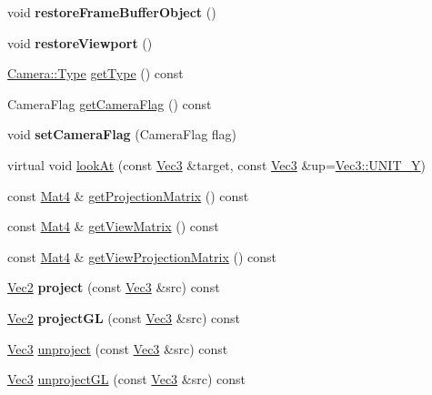 \begin{DoxyCompactItemize}
void {\bfseries restore\+Frame\+Buffer\+Object} ()
\item 
\mbox{\label{classCamera_abe884ec7b69ff038dfae1ec47e6cd6d8}} 
void {\bfseries restore\+Viewport} ()
\item 
\hyperlink{classCamera_a3b0a1f58deca679ac665f61c480d1dcb}{Camera\+::\+Type} \hyperlink{classCamera_ae8f514578aa54023476ad541b167a1e0}{get\+Type} () const
\item 
Camera\+Flag \hyperlink{classCamera_ae7a648c0780484ba413a6197a489f208}{get\+Camera\+Flag} () const
\item 
\mbox{\label{classCamera_a8e214f667fd598da856d0e29eb101c7b}} 
void {\bfseries set\+Camera\+Flag} (Camera\+Flag flag)
\item 
virtual void \hyperlink{classCamera_a0eca5fae6b9b7a1ad949d9647e48ca52}{look\+At} (const \hyperlink{classVec3}{Vec3} \&target, const \hyperlink{classVec3}{Vec3} \&up=\hyperlink{classVec3_a0d569defe7293f1cb108f643230facf5}{Vec3\+::\+U\+N\+I\+T\+\_\+Y})
\item 
const \hyperlink{classMat4}{Mat4} \& \hyperlink{classCamera_a5fd60cb16045d8102c88db4a8c2f20f0}{get\+Projection\+Matrix} () const
\item 
const \hyperlink{classMat4}{Mat4} \& \hyperlink{classCamera_a72ba7f33c43ae0f1e907292befb8fa3b}{get\+View\+Matrix} () const
\item 
const \hyperlink{classMat4}{Mat4} \& \hyperlink{classCamera_a04b8c6249119046519ddd62b283928b6}{get\+View\+Projection\+Matrix} () const
\item 
\mbox{\label{classCamera_a6288e57471300fa5aed8dd73f8926b66}} 
\hyperlink{classVec2}{Vec2} {\bfseries project} (const \hyperlink{classVec3}{Vec3} \&src) const
\item 
\mbox{\label{classCamera_a4a84dc5bc3e0327d7058c9c369cd3d3a}} 
\hyperlink{classVec2}{Vec2} {\bfseries project\+GL} (const \hyperlink{classVec3}{Vec3} \&src) const
\item 
\hyperlink{classVec3}{Vec3} \hyperlink{classCamera_a06eccde5c9fc644d94e69e505a78d048}{unproject} (const \hyperlink{classVec3}{Vec3} \&src) const
\item 
\hyperlink{classVec3}{Vec3} \hyperlink{classCamera_ac4b6f76b3c9569e12b528e423e45ea41}{unproject\+GL} (const \hyperlink{classVec3}{Vec3} \&src) const
\item 

\end{DoxyCompactItemize}
